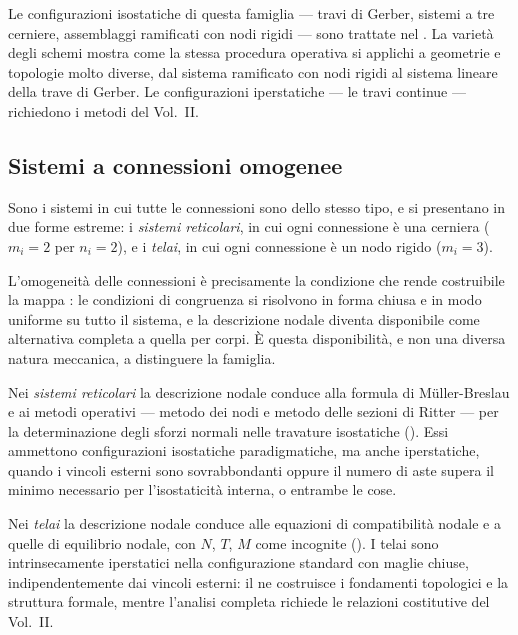 Le configurazioni isostatiche di questa famiglia --- travi
di Gerber, sistemi a tre cerniere, assemblaggi ramificati
con nodi rigidi --- sono trattate nel
. La varietà degli
schemi mostra come la stessa procedura operativa si applichi
a geometrie e topologie molto diverse, dal sistema ramificato
con nodi rigidi al sistema lineare della trave di Gerber.
Le configurazioni iperstatiche --- le travi continue ---
richiedono i metodi del Vol.~II.


\subsection{Sistemi a connessioni omogenee}
\label{subsec:cat_omogenee}

Sono i sistemi in cui tutte le connessioni sono dello stesso
tipo, e si presentano in due forme estreme: i \emph{sistemi
	reticolari}, in cui ogni connessione è una cerniera
($m_i = 2$ per $n_i = 2$), e i \emph{telai}, in cui ogni
connessione è un nodo rigido ($m_i = 3$).

L'omogeneità delle connessioni è precisamente la condizione
che rende costruibile la mappa
: le condizioni di congruenza
si risolvono in forma chiusa e in modo uniforme su tutto il
sistema, e la descrizione nodale diventa disponibile come
alternativa completa a quella per corpi. È questa
disponibilità, e non una diversa natura meccanica, a
distinguere la famiglia.

Nei \emph{sistemi reticolari} la descrizione nodale conduce
alla formula di Müller-Breslau e ai metodi operativi ---
metodo dei nodi e metodo delle sezioni di Ritter --- per la
determinazione degli sforzi normali nelle travature
isostatiche (). Essi ammettono
configurazioni isostatiche paradigmatiche, ma anche
iperstatiche, quando i vincoli esterni sono sovrabbondanti
oppure il numero di aste supera il minimo necessario per
l'isostaticità interna, o entrambe le cose.

Nei \emph{telai} la descrizione nodale conduce alle
equazioni di compatibilità nodale e a quelle di equilibrio
nodale, con $N$, $T$, $M$ come incognite
(). I telai sono intrinsecamente
iperstatici nella configurazione standard con maglie chiuse,
indipendentemente dai vincoli esterni: il
 ne costruisce i fondamenti
topologici e la struttura formale, mentre l'analisi completa
richiede le relazioni costitutive del Vol.~II.


